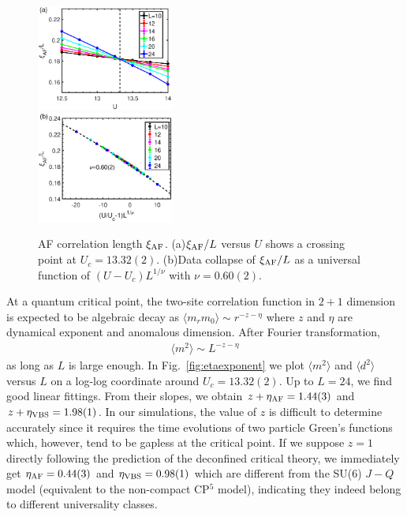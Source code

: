 \documentclass[twocolumn,superscriptaddress,prb]{revtex4-1}
\begin{document}
\begin{figure}
    \includegraphics[width=0.4\textwidth]{correlationlength_af}\\
    \includegraphics[width=0.4\textwidth]{datacollapse_xi}
    \caption{\label{fig:correlationlength_af} AF correlation length $\xi_{\rm AF}$. (a)$\xi_{\rm AF}/L$ versus $U$ shows a crossing point at $U_c=13.32(2)$. (b)Data collapse of $\xi_{\rm AF}/L$ as a universal function of $(U-U_c)L^{1/\nu}$ with $\nu=0.60(2)$.}
\end{figure}




At a quantum critical point, the two-site correlation function in $2+1$ dimension is expected to be algebraic decay as $\langle m_rm_0\rangle\sim r^{-z-\eta}$ where $z$ and $\eta$ are dynamical exponent and anomalous dimension. \cite{Sondhi_RMP_1997} After Fourier transformation, \begin{eqnarray} \langle m^2 \rangle \sim L^{-z-\eta} \end{eqnarray}
as long as $L$ is large enough. In Fig.~\ref{fig:etaexponent} we plot $\langle m^2 \rangle$ and $\langle d^2\rangle$ versus $L$ on a log-log coordinate around $U_c=13.32(2)$. Up to $L=24$, we find good linear fittings. From their slopes, we obtain $z+\eta_{\rm AF}=1.44(3)$ and $z+\eta_{\rm VBS}=1.98(1)$. In our simulations, the value of $z$ is difficult to determine accurately since it requires the time evolutions of two particle Green's functions which, however, tend to be gapless at the critical point. If we suppose $z=1$ directly following the prediction of the deconfined critical theory, \cite{Senthil_S_2004,*Senthil_PRB_2004,*Levin_PRB_2004} we immediately get $\eta_{\rm AF}=0.44(3)$ and $\eta_{\rm VBS}=0.98(1)$ which are different from the SU(6) $J-Q$ model (equivalent to the non-compact CP$^5$ model), \cite{Kaul_PRL_2012} indicating they indeed belong to different universality classes. 
\end{document}

